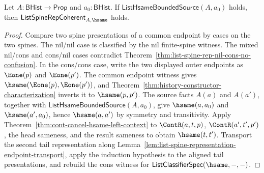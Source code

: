 \begin{theorem}
\label{thm:list-hsame-bounded-source-spine-coherence}
Let $A:\mathsf{BHist}\to\mathsf{Prop}$ and $a_0:\mathsf{BHist}$. If
$\mathsf{ListHsameBoundedSource}(A,a_0)$ holds, then
$\mathsf{ListSpineRepCoherent}_{A,\hsame}$ holds.
\end{theorem}
\begin{proof}
Compare two spine presentations of a common endpoint by cases on the two
spines. The nil/nil case is classified by the nil finite-spine witness. The
mixed nil/cons and cons/nil cases contradict
Theorem~\ref{thm:list-spine-rep-nil-cons-no-confusion}. In the cons/cons case,
write the two displayed outer endpoints as $\Eone(p)$ and $\Eone(p')$. The
common endpoint witness gives $\hsame(\Eone(p),\Eone(p'))$, and
Theorem~\ref{thm:history-constructor-characterization} inverts it to
$\hsame(p,p')$. The source facts $A(a)$ and $A(a')$, together with
$\mathsf{ListHsameBoundedSource}(A,a_0)$, give $\hsame(a,a_0)$ and
$\hsame(a',a_0)$, hence $\hsame(a,a')$ by symmetry and transitivity. Apply
Theorem~\ref{thm:cont-cancel-hsame-left-context} to $\ContR(a,t,p)$,
$\ContR(a',t',p')$, the head sameness, and the result sameness to obtain
$\hsame(t,t')$. Transport the second tail representation along
Lemma~\ref{lem:list-spine-representation-endpoint-transport}, apply the
induction hypothesis to the aligned tail presentations, and rebuild the cons
witness for $\mathsf{ListClassifierSpec}(\hsame,-,-)$.
\end{proof}

